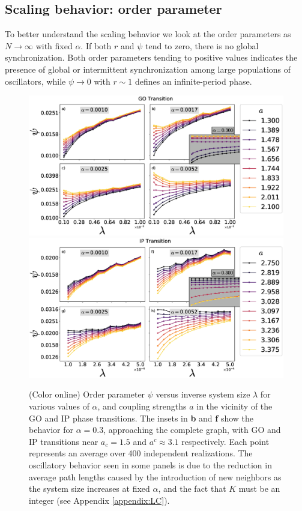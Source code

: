 \subsection{Scaling behavior: order parameter}

To better understand the scaling behavior we look at the order parameters as $N \to \infty$ with fixed $\alpha$. If both $r$ and $\psi$
tend to zero, there is no global synchronization. Both order parameters tending to positive values indicates the presence of global or
intermittent synchronization among large populations of oscillators, while $\psi \to 0$ with $r \sim 1$ defines an infinite-period
phase.

\begin{figure}
\begin{center}
    \includegraphics[width=0.85\linewidth]{fig/chap2/opsplit-psi-got.eps}
    \includegraphics[width=0.85\linewidth]{fig/chap2/opsplit-psi-ipt.eps}
\end{center}
\caption{\label{fig:opsplit} (Color online) Order parameter $\psi$ versus inverse system size $\lambda$ for various values of $\alpha$,
    and coupling strengths $a$ in the vicinity of the GO and IP phase transitions. The insets in \textbf{b} and \textbf{f} show the
    behavior for $\alpha=0.3$, approaching the complete graph, with GO and IP transitions near $a_c=1.5$ and $a^c\approx3.1$
    respectively.  Each point represents an average over 400 independent realizations.  The oscillatory behavior seen in some panels is
due to the reduction in average path lengths caused by the introduction of new neighbors as the system size increases at fixed
$\alpha$, and the fact that $K$ must be an integer (see Appendix \ref{appendix:LC}).}
\end{figure}

